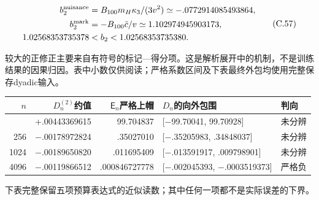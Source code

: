 \documentclass[11pt,a4paper]{article}
\begin{document}
\[
\begin{aligned}
b_2^{\rm nuisance}&=B_{100}m_H\kappa_3/(3v^2)\simeq-.0772914085493864,\\
b_2^{\rm mark}&=-B_{100}\bar c/v\simeq1.102974945903173,\\
1.02568353735378&<b_2<1.02568353735380.
\end{aligned}
\tag{C.57}
\]

较大的正修正主要来自有符号的标记---得分项。这是解析展开中的机制，不是训练结果的因果归因。表中小数仅供阅读；严格系数区间及下表最终外包均使用完整保存dyadic输入。

\begin{longtable}[]{@{}rrrll@{}}
\toprule\noalign{}
\(n\) & \(D_n^{(2)}\)约值 & \(\mathsf E_n\)严格上帽 & \(D_n\)的向外包围
& 判向 \\
\midrule\noalign{}
\endhead
\bottomrule\noalign{}
\endlastfoot
64 & +.00443369615 & 99.704837 & {[}−99.70041, 99.70928{]} & 未分辨 \\
256 & −.00178972824 & .35027010 & {[}−.35205983, .34848037{]} &
未分辨 \\
1024 & −.00189650820 & .011695409 & {[}−.013591917, .009798901{]} &
未分辨 \\
4096 & −.00119866512 & .000846727778 & {[}−.002045393, −.0003519373{]} &
严格负 \\
\end{longtable}

下表完整保留五项预算表达式的近似读数；其中任何一项都不是实际误差的下界。
\end{document}
